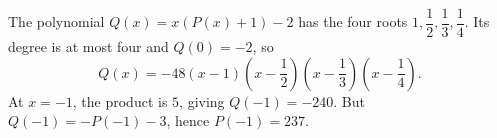 The polynomial $Q(x)=x(P(x)+1)-2$ has the four roots $1,\dfrac{1}{2},\dfrac{1}{3},\dfrac{1}{4}$. Its degree is at most four and $Q(0)=-2$, so
\[
Q(x)=-48(x-1)\left(x-\dfrac{1}{2}\right)\left(x-\dfrac{1}{3}\right)\left(x-\dfrac{1}{4}\right).
\]
At $x=-1$, the product is $5$, giving $Q(-1)=-240$. But $Q(-1)=-P(-1)-3$, hence $\boxed{P(-1)=237}$.
